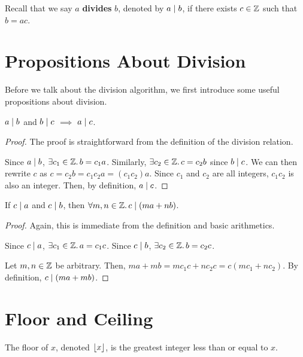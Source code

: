 Recall that we say $a$ \textbf{divides} $b$, denoted by $a \mathrel{\mid} b$, if there exists $c \in \mathbb{Z}$ such that $b = ac$.

\section{Propositions About Division}

Before we talk about the division algorithm, we first introduce some useful propositions about division.

\begin{proposition}
    $a \mathrel{\mid} b$ and $b \mathrel{\mid} c$ $\implies$ $a \mathrel{\mid} c$. 
\end{proposition}

\begin{proof}
    The proof is straightforward from the definition of the division relation.

    Since $a \mathrel{\mid} b$, $\exists c_1 \in \mathbb{Z}.\, b = c_1a$. Similarly, $\exists c_2 \in \mathbb{Z}.\, c = c_2 b$ since $b \mathrel{\mid} c$. We can then rewrite $c$ as $c = c_2 b = c_1c_2a = (c_1c_2)a$. Since $c_1$ and $c_2$ are all integers, $c_1c_2$ is also an integer. Then, by definition, $a \mathrel{\mid} c$.
\end{proof}

\begin{proposition}
    If $c \mathrel{\mid} a$ and $c \mathrel{\mid} b$, then $\forall m,n \in \mathbb{Z}.\, c \mathrel{\mid} (ma+nb)$.
\end{proposition}

\begin{proof}
    Again, this is immediate from the definition and basic arithmetics.

    Since $c \mathrel{\mid} a$, $\exists c_1 \in \mathbb{Z}.\, a = c_1c$. Since $c \mathrel{\mid} b$, $\exists c_2 \in \mathbb{Z}.\, b = c_2 c$.

    Let $m,n \in \mathbb{Z}$ be arbitrary. Then, $ma + mb = mc_1c+nc_2c = c(mc_1 + nc_2)$. By definition, $c \mathrel{\mid} (ma + mb)$.
\end{proof}

\section{Floor and Ceiling}

\begin{definition}[Floor]
    The floor of $x$, denoted $\lfloor x\rfloor$, is the greatest integer less than or equal to $x$.
\end{definition}

